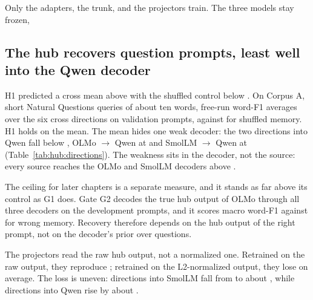 Only the adapters, the trunk, and the projectors train. The three models stay frozen, 

\subsection{The hub recovers question prompts, least well into the Qwen decoder}\label{sec:hub:corpusA}

H1 predicted a cross mean above  with the shuffled control below . On Corpus A, short Natural Questions queries of about ten words, free-run word-F1 averages  over the six cross directions on  validation prompts, against  for shuffled memory. %
H1 holds on the mean. The mean hides one weak decoder: the two directions into Qwen fall below , OLMo $\to$ Qwen at  and SmolLM $\to$ Qwen at  (Table~\ref{tab:hub:directions}). %
The weakness sits in the decoder, not the source: every source reaches the OLMo and SmolLM decoders above . %

The ceiling for later chapters is a separate measure, and it stands as far above its control as G1 does. Gate G2 decodes the true hub output of OLMo through all three decoders on the  development prompts, and it scores  macro word-F1 against  for wrong memory. %
Recovery therefore depends on the hub output of the right prompt, not on the decoder's prior over questions.

The projectors read the raw hub output, not a normalized one. Retrained on the raw output, they reproduce ; retrained on the L2-normalized output, they lose  on average. The loss is uneven: directions into SmolLM fall from  to about , while directions into Qwen rise by about . %

